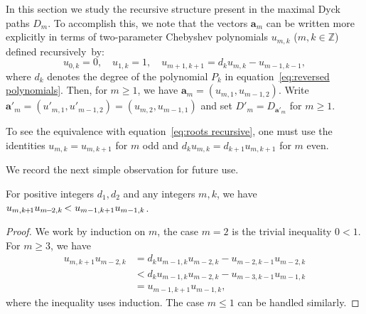 \documentclass[ALCO,ThmDefs,Unicode,epreuves]{cedram}
\newcommand{\bfa}{\mathbf{a}}
\newcommand{\ZZ}{\mathbb{Z}}
\newcommand*{\Mk}{\mkern -2mu}
\begin{document}
In this section we study the recursive structure present in the maximal Dyck paths $D_m$. 
To accomplish this, we note that the vectors $\bfa_m$ can be written more explicitly in terms of two-parameter Chebyshev polynomials $u_{m,k}$ ($m,k\in \ZZ$) defined recursively~by: 
\begin{equation}
 \label{eq:chebyshev}
 u_{0,k}=0,\quad
 u_{1,k}=1,\quad
 u_{m+1,k+1}=d_ku_{m,k}-u_{m-1,k-1},
\end{equation}
where $d_k$ denotes the degree of the polynomial $P_k$ in equation~\eqref{eq:reversed polynomials}. 
Then, for $m\ge 1$, we have $\bfa_m=(u_{m,1},u_{m-1,2})$. Write $\bfa'_m=(u'_{m,1},u'_{m-1,2})=(u_{m,2},u_{m-1,1})$ and set $D'_m=D_{\bfa'_m}$ for $m\ge1$. 
\begin{remark}
 \label{rem:chebyshev}
 To see the equivalence with equation~\eqref{eq:roots recursive}, one must use the identities $u_{m,k}=u_{m,k+1}$ for $m$ odd and $d_ku_{m,k}=d_{k+1}u_{m,k+1}$ for $m$ even.
\end{remark}
We record the next simple observation for future use.
\begin{lemma}
 \label{le:Dyck path inequality}
 For positive integers $d_1,d_2$ and any integers $m,k$, we have $u_{m,k\Mk +\Mk 1}u_{m\Mk -\Mk 2,k}\Mk <u_{m-1,k+1}u_{m-1,k}$.
\end{lemma}
\begin{proof}
 We work by induction on $m$, the case $m=2$ is the trivial inequality $0<1$. 
 For $m\ge3$, we have
 \begin{align*}
 u_{m,k+1}u_{m-2,k}
 &=d_ku_{m-1,k}u_{m-2,k}-u_{m-2,k-1}u_{m-2,k}\\
 &<d_ku_{m-1,k}u_{m-2,k}-u_{m-3,k-1}u_{m-1,k}\\
 &=u_{m-1,k+1}u_{m-1,k},
 \end{align*}
 where the inequality uses induction.
 The case $m\le 1$ can be handled similarly.
\end{proof}
\end{document}
